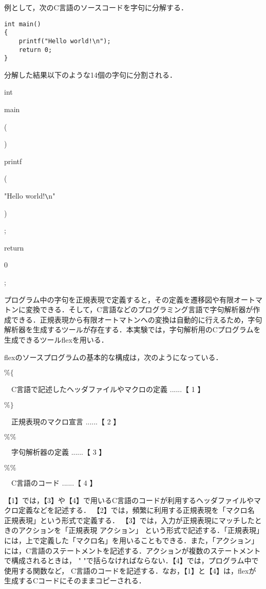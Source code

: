 \documentclass[a4j]{jsarticle}  %
\begin{document}
例として，次のC言語のソースコードを字句に分解する．
\begin{shadebox}
\begin{verbatim}
int main()
{
    printf("Hello world!\n");
    return 0;
}
\end{verbatim}
\end{shadebox}

分解した結果以下のような14個の字句に分割される．
\begin{screen}
\begin{enumerate}
\item int
\item main
\item (
\item )
\item {
\item printf
\item (
\item "Hello world!\verb|\|n"
\item )
\item ;
\item return
\item 0
\item ;
\item }
\end{enumerate}
\end{screen}

プログラム中の字句を正規表現で定義すると，その定義を遷移図や有限オートマトンに変換できる．そして，C言語などのプログラミング言語で字句解析器が作成できる．正規表現から有限オートマトンへの変換は自動的に行えるため，字句解析器を生成するツールが存在する．本実験では，字句解析用のCプログラムを生成できるツールflexを用いる．

flexのソースプログラムの基本的な構成は，次のようになっている．

\begin{shadebox}
$\%\{$
 
\ \ C言語で記述したヘッダファイルやマクロの定義 ......【 1 】

$\%\}$

\ \ 正規表現のマクロ宣言 ......【 2 】

$\%\%$

\ \ 字句解析器の定義 ......【 3 】

$\%\%$

\ \ C言語のコード ......【 4 】
\end{shadebox}

【1】では，【3】や【4】で用いるC言語のコードが利用するヘッダファイルやマクロ定義などを記述する．
【2】では，頻繁に利用する正規表現を「マクロ名 正規表現」という形式で定義する．
【3】では，入力が正規表現にマッチしたときのアクションを「正規表現 アクション」
という形式で記述する．「正規表現」には，上で定義した「マクロ名」を用いることもできる．また，「アクション」には，C言語のステートメントを記述する．アクションが複数のステートメントで構成されるときは，
"{ }"で括らなければならない．【4】では，プログラム中で使用する関数など，
C言語のコードを記述する．なお，【1】と【4】は，flexが生成するCコードにそのままコピーされる．
\end{document}
